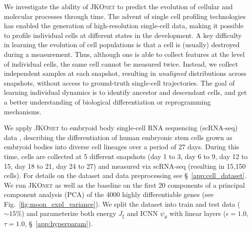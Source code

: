 We investigate the ability of \textsc{JKOnet} to predict the evolution of cellular and molecular processes through time.
The advent of single cell profiling technologies has enabled the generation of high-resolution single-cell data, making it possible to profile individual cells at different states in the development. 
A key difficulty in learning the evolution of cell populations is that a cell is (usually)  destroyed during a measurement. Thus, although one is able to collect features at the level of individual cells, the same cell cannot be measured twice. Instead, we collect independent samples at each snapshot, resulting in \emph{unaligned} distributions across snapshots, without access to ground-truth single-cell trajectories. 
The goal of learning individual dynamics is to identify ancestor and descendant cells, and get a better understanding of biological differentiation or reprogramming mechanisms. 

We apply \textsc{JKOnet} to embryoid body single-cell RNA sequencing (scRNA-seq) data \citep{moon2019}, describing the differentiation of human embryonic stem cells grown as embryoid bodies into diverse cell lineages over a period of 27 days. During this time, cells are collected at 5 different snapshots (day 1 to 3, day 6 to 9, day 12 to 15, day 18 to 21, day 24 to 27) and measured via scRNA-seq (resulting in 15,150 cells). For details on the dataset and data preprocessing see \S~\ref{app:cell_dataset}.
We run \textsc{JKOnet} as well as the baseline on the first 20 components of a principal component analysis (PCA) of the 4000 highly differentiable genes (see Fig.~\ref{fig:moon_expl_variance}).
We split the dataset into train and test data ($\sim 15 \%$) and parameterize both energy $J_\xi$ and ICNN $\psi_\theta$ with linear layers ($\epsilon = 1.0$, $\tau = 1.0$, \S~\ref{app:hyperparam}).

